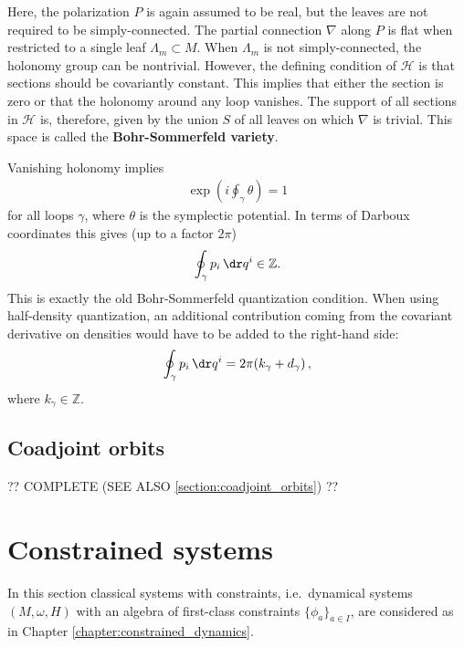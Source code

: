     \begin{method}
        Here, the polarization $P$ is again assumed to be real, but the leaves are not required to be simply-connected. The partial connection $\nabla$ along $P$ is flat when restricted to a single leaf $\Lambda_m\subset M$. When $\Lambda_m$ is not simply-connected, the holonomy group can be nontrivial. However, the defining condition of $\mathcal{H}$ is that sections should be covariantly constant. This implies that either the section is zero or that the holonomy around any loop vanishes. The support of all sections in $\mathcal{H}$ is, therefore, given by the union $S$ of all leaves on which $\nabla$ is trivial. This space is called the \textbf{Bohr-Sommerfeld variety}.

        Vanishing holonomy implies
        \begin{gather}
            \exp\left(i\oint_\gamma\theta\right) = 1
        \end{gather}
        for all loops $\gamma$, where $\theta$ is the symplectic potential. In terms of Darboux coordinates this gives (up to a factor $2\pi$)
        \begin{gather}
            \oint_\gamma p_i\,\dr q^i\in\mathbb{Z}.
        \end{gather}
        This is exactly the old Bohr-Sommerfeld quantization condition. When using half-density quantization, an additional contribution coming from the covariant derivative on densities would have to be added to the right-hand side:
        \begin{gather}
            \oint_\gamma p_i\,\dr q^i = 2\pi(k_\gamma + d_\gamma)\,,
        \end{gather}
        where $k_\gamma\in\mathbb{Z}$.
    \end{method}

\subsection{Coadjoint orbits}

    ?? COMPLETE (SEE ALSO \ref{section:coadjoint_orbits}) ??

\section{Constrained systems}\label{section:quantum_constrained}

    In this section classical systems with constraints, i.e.~dynamical systems $(M,\omega,H)$ with an algebra of first-class constraints $\{\phi_a\}_{a\in I}$, are considered as in Chapter \ref{chapter:constrained_dynamics}.

